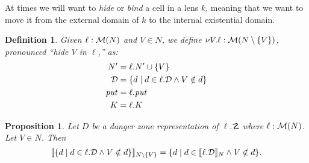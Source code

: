 \documentclass{article}
\newtheorem{definition}{Definition}
\newtheorem{proposition}{Proposition}
\begin{document}
At times we will want to \emph{hide} or \emph{bind} a cell in a lens $k$, 
meaning that we want to move it from the external domain of $k$ to the
internal existential domain.
\begin{definition}
    Given $\ell : \mathcal M(N)$ and $V \in N$, we define $\nu V.\ell : \mathcal M(N
    \setminus \{V\})$, pronounced ``hide $V$ in $\ell$,'' as:
    \begin{align*}
        N' &= \ell.N' \cup \{V\} \\
        \mathcal D &= \{d \mid d \in \ell.\mathcal D \land V \notin d\} \\
        \mathit{put} &= \ell.\mathit{put} \\
        K &= \ell.K
    \end{align*}
\end{definition}

\begin{proposition}
    Let $D$ be a danger zone representation of $\ell.\danger$ where
    $\ell : \mathcal M(N)$. Let $V \in N$. Then 
    \[ \llbracket \{d \mid d \in \ell.\mathcal D \land V \notin d\} \rrbracket_{N\setminus\{V\}}
        = \{ d \mid d \in \llbracket \ell.\mathcal D \rrbracket_{N} \land V \notin d\}. \]
\end{proposition}
\end{document}
